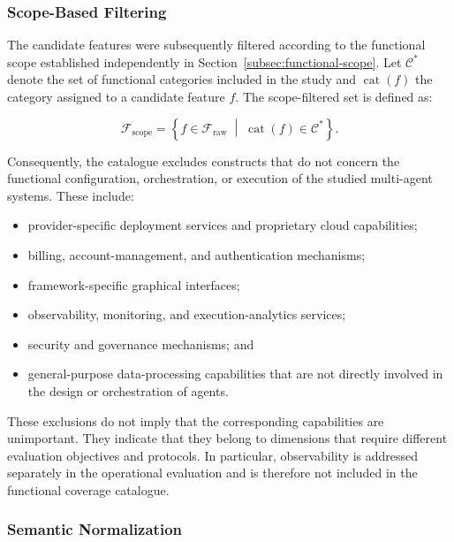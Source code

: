 \subsubsection{Scope-Based Filtering}

The candidate features were subsequently filtered according to the functional
scope established independently in
Section~\ref{subsec:functional-scope}. Let $\mathcal{C}^{*}$ denote the set of
functional categories included in the study and
$\operatorname{cat}(f)$ the category assigned to a candidate feature $f$. The
scope-filtered set is defined as:

\begin{equation}
    \mathcal{F}_{\mathrm{scope}}
    =
    \left\{
        f \in \mathcal{F}_{\mathrm{raw}}
        \;\middle|\;
        \operatorname{cat}(f) \in \mathcal{C}^{*}
    \right\}.
    \label{eq:scope-filtered-features}
\end{equation}

Consequently, the catalogue excludes constructs that do not concern the
functional configuration, orchestration, or execution of the studied
multi-agent systems. These include:

\begin{itemize}
    \item provider-specific deployment services and proprietary cloud
    capabilities;
    \item billing, account-management, and authentication mechanisms;
    \item framework-specific graphical interfaces;
    \item observability, monitoring, and execution-analytics services;
    \item security and governance mechanisms; and
    \item general-purpose data-processing capabilities that are not directly
    involved in the design or orchestration of agents.
\end{itemize}

These exclusions do not imply that the corresponding capabilities are
unimportant. They indicate that they belong to dimensions that require
different evaluation objectives and protocols. In particular, observability
is addressed separately in the operational evaluation and is therefore not
included in the functional coverage catalogue.

\subsubsection{Semantic Normalization}

